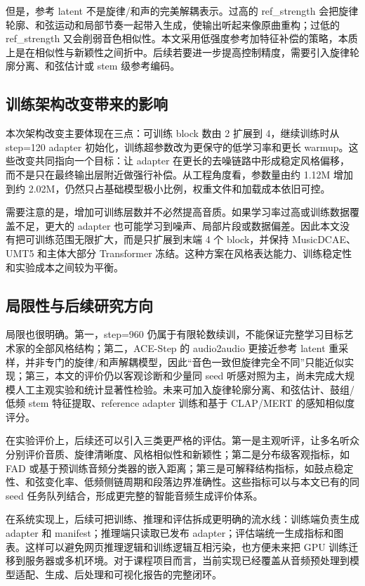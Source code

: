 \documentclass[UTF8,a4paper,zihao=-4,fontset=none]{ctexart}
\begin{document}
但是，参考 latent 不是旋律/和声的完美解耦表示。过高的 ref\_strength 会把旋律轮廓、和弦运动和局部节奏一起带入生成，使输出听起来像原曲重构；过低的 ref\_strength 又会削弱音色相似性。本文采用低强度参考加特征补偿的策略，本质上是在相似性与新颖性之间折中。后续若要进一步提高控制精度，需要引入旋律轮廓分离、和弦估计或 stem 级参考编码。

\subsection{训练架构改变带来的影响}
本次架构改变主要体现在三点：可训练 block 数由 2 扩展到 4，继续训练时从 step=120 adapter 初始化，训练超参数改为更保守的低学习率和更长 warmup。这些改变共同指向一个目标：让 adapter 在更长的去噪链路中形成稳定风格偏移，而不是只在最终输出层附近做强行补偿。从工程角度看，参数量由约 1.12M 增加到约 2.02M，仍然只占基础模型极小比例，权重文件和加载成本依旧可控。

需要注意的是，增加可训练层数并不必然提高音质。如果学习率过高或训练数据覆盖不足，更大的 adapter 也可能学习到噪声、局部片段或数据偏差。因此本文没有把可训练范围无限扩大，而是只扩展到末端 4 个 block，并保持 MusicDCAE、UMT5 和主体大部分 Transformer 冻结。这种方案在风格表达能力、训练稳定性和实验成本之间较为平衡。

\subsection{局限性与后续研究方向}
局限也很明确。第一，step=960 仍属于有限轮数续训，不能保证完整学习目标艺术家的全部风格结构；第二，ACE-Step 的 audio2audio 更接近参考 latent 重采样，并非专门的旋律/和声解耦模型，因此“音色一致但旋律完全不同”只能近似实现；第三，本文的评价仍以客观诊断和少量同 seed 听感对照为主，尚未完成大规模人工主观实验和统计显著性检验。未来可加入旋律轮廓分离、和弦估计、鼓组/低频 stem 特征提取、reference adapter 训练和基于 CLAP/MERT 的感知相似度评分。

在实验评价上，后续还可以引入三类更严格的评估。第一是主观听评，让多名听众分别评价音质、旋律清晰度、风格相似性和新颖性；第二是分布级客观指标，如 FAD 或基于预训练音频分类器的嵌入距离；第三是可解释结构指标，如鼓点稳定性、和弦变化率、低频侧链周期和段落边界准确性。这些指标可以与本文已有的同 seed 任务队列结合，形成更完整的智能音频生成评价体系。

在系统实现上，后续可把训练、推理和评估拆成更明确的流水线：训练端负责生成 adapter 和 manifest；推理端只读取已发布 adapter；评估端统一生成指标和图表。这样可以避免网页推理逻辑和训练逻辑互相污染，也方便未来把 GPU 训练迁移到服务器或多机环境。对于课程项目而言，当前实现已经覆盖从音频预处理到模型适配、生成、后处理和可视化报告的完整闭环。
\end{document}
